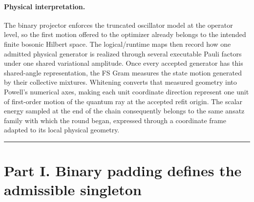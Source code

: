 \documentclass[10pt,twocolumn]{article}
\newcommand{\FS}{\mathrm{FS}}
\newcommand{\conceptbreak}{%
  \par\medskip\noindent
  {\color{black!30}\rule{\columnwidth}{0.35pt}}%
  \par\medskip}
\newcommand{\physical}{\paragraph{Physical interpretation.}}
\begin{document}
\begin{center}
\end{center}

\physical The binary projector enforces the truncated oscillator model at the
operator level, so the first motion offered to the optimizer already belongs to
the intended finite bosonic Hilbert space. The logical/runtime maps then record
how one admitted physical generator is realized through several executable
Pauli factors under one shared variational amplitude.
Once every accepted generator has this shared-angle representation, the FS
Gram measures the state motion generated by their collective mixtures.
Whitening converts that measured geometry into Powell's numerical axes, making
each unit coordinate direction represent one unit of first-order motion of the
quantum ray at the accepted refit origin. The scalar energy sampled at the end
of the chain consequently belongs to the same ansatz family with which the
round began, expressed through a coordinate frame adapted to its local physical
geometry.

\conceptbreak

\section*{Part I. Binary padding defines the admissible singleton}
\end{document}
